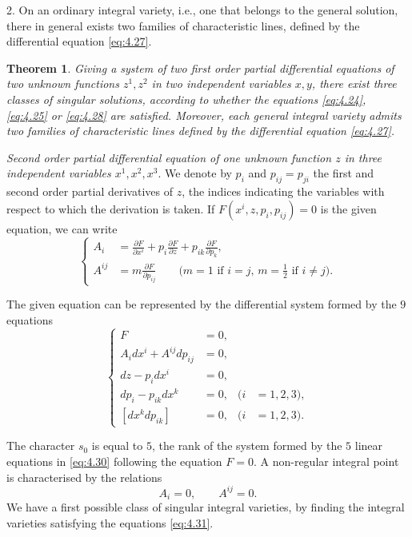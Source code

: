 \documentclass[leqno,11pt]{book}
\numberwithin{equation}{chapter}
\newcommand{\pd}{\partial}
\theoremstyle{shape1}
\newtheorem*{thm*}{\hspace{15pt}Theorem}
\theoremstyle{shape0}
\theoremstyle{shape2}
\theoremstyle{definition}
\begin{document}
2. On an ordinary integral variety, i.e., one that belongs to the general solution, there in general exists two families of characteristic lines, defined by the differential equation \eqref{eq:4.27}.
\begin{thm*}
  Giving a system of two first order partial differential equations of two unknown functions $z^{1},z^{2}$ in two independent variables $x,y$, there exist three classes of singular solutions, according to whether the equations \eqref{eq:4.24}, \eqref{eq:4.25} or \eqref{eq:4.28} are satisfied. Moreover, each general integral variety admits two families of characteristic lines defined by the differential equation \eqref{eq:4.27}.
\end{thm*}

\vspace{12pt}\fsec \emph{Second order partial differential equation of one unknown function $z$ in three independent variables $x^{1},x^{2},x^{3}$}. We denote by $p_{i}$ and $p_{ij}=p_{ji}$ the first and second order partial derivatives of $z$, the indices indicating the variables with respect to which the derivation is taken. If $F(x^{i},z,p_{i},p_{ij})=0$ is the given equation, we can write
\begin{equation}
  \label{eq:4.29}
  \left\{
    \begin{aligned}
      A_{i}&=\frac{\pd F}{\pd x^{i}}+p_{i}\frac{\pd F}{\pd z}+p_{ik}\frac{\pd F}{\pd p_{k}},\\
      A^{ij}&=m\frac{\pd F}{\pd p_{ij}}\qquad \text{($m=1$ if $i=j$, $m=\frac{1}{2}$ if $i\neq j$).}
    \end{aligned}
\right.
\end{equation}

The given equation can be represented by the differential system formed by the $9$ equations
\begin{equation}
  \label{eq:4.30}
  \left\{
    \begin{aligned}
      F&=0,\\
      A_{i}dx^{i}+A^{ij}dp_{ij}&=0,\\
      dz-p_{i}dx^{i}&=0,\\
      dp_{i}-p_{ik}dx^{k}&=0,&(i&=1,2,3),\\
      [dx^{k}dp_{ik}]&=0,&(i&=1,2,3).
    \end{aligned}
\right.
\end{equation}

The character $s_{0}$ is equal to $5$, the rank of the system formed by the $5$ linear equations in \eqref{eq:4.30} following the equation $F=0$. A non-regular integral point is characterised by the relations
\begin{equation}
  \label{eq:4.31}
  A_{i}=0,\qquad A^{ij}=0.
\end{equation}
We have a first possible class of singular integral varieties, by finding the integral varieties satisfying the equations \eqref{eq:4.31}.
\end{document}
